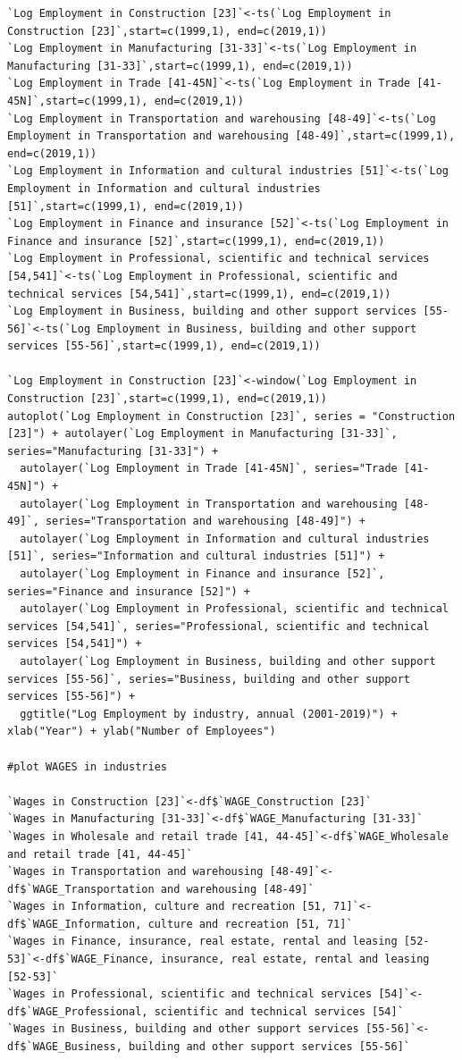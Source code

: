 \documentclass[12pt]{article}
\begin{document}
\begin{verbatim}
`Log Employment in Construction [23]`<-ts(`Log Employment in Construction [23]`,start=c(1999,1), end=c(2019,1))
`Log Employment in Manufacturing [31-33]`<-ts(`Log Employment in Manufacturing [31-33]`,start=c(1999,1), end=c(2019,1))
`Log Employment in Trade [41-45N]`<-ts(`Log Employment in Trade [41-45N]`,start=c(1999,1), end=c(2019,1))
`Log Employment in Transportation and warehousing [48-49]`<-ts(`Log Employment in Transportation and warehousing [48-49]`,start=c(1999,1), end=c(2019,1))
`Log Employment in Information and cultural industries [51]`<-ts(`Log Employment in Information and cultural industries [51]`,start=c(1999,1), end=c(2019,1))
`Log Employment in Finance and insurance [52]`<-ts(`Log Employment in Finance and insurance [52]`,start=c(1999,1), end=c(2019,1))
`Log Employment in Professional, scientific and technical services [54,541]`<-ts(`Log Employment in Professional, scientific and technical services [54,541]`,start=c(1999,1), end=c(2019,1))
`Log Employment in Business, building and other support services [55-56]`<-ts(`Log Employment in Business, building and other support services [55-56]`,start=c(1999,1), end=c(2019,1))

`Log Employment in Construction [23]`<-window(`Log Employment in Construction [23]`,start=c(1999,1), end=c(2019,1)) 
autoplot(`Log Employment in Construction [23]`, series = "Construction [23]") + autolayer(`Log Employment in Manufacturing [31-33]`, series="Manufacturing [31-33]") +
  autolayer(`Log Employment in Trade [41-45N]`, series="Trade [41-45N]") +
  autolayer(`Log Employment in Transportation and warehousing [48-49]`, series="Transportation and warehousing [48-49]") +
  autolayer(`Log Employment in Information and cultural industries [51]`, series="Information and cultural industries [51]") +
  autolayer(`Log Employment in Finance and insurance [52]`, series="Finance and insurance [52]") +
  autolayer(`Log Employment in Professional, scientific and technical services [54,541]`, series="Professional, scientific and technical services [54,541]") +
  autolayer(`Log Employment in Business, building and other support services [55-56]`, series="Business, building and other support services [55-56]") +
  ggtitle("Log Employment by industry, annual (2001-2019)") + xlab("Year") + ylab("Number of Employees")

#plot WAGES in industries

`Wages in Construction [23]`<-df$`WAGE_Construction [23]`
`Wages in Manufacturing [31-33]`<-df$`WAGE_Manufacturing [31-33]`
`Wages in Wholesale and retail trade [41, 44-45]`<-df$`WAGE_Wholesale and retail trade [41, 44-45]`
`Wages in Transportation and warehousing [48-49]`<-df$`WAGE_Transportation and warehousing [48-49]`
`Wages in Information, culture and recreation [51, 71]`<-df$`WAGE_Information, culture and recreation [51, 71]`	
`Wages in Finance, insurance, real estate, rental and leasing [52-53]`<-df$`WAGE_Finance, insurance, real estate, rental and leasing [52-53]`
`Wages in Professional, scientific and technical services [54]`<-df$`WAGE_Professional, scientific and technical services [54]`
`Wages in Business, building and other support services [55-56]`<-df$`WAGE_Business, building and other support services [55-56]`


\end{verbatim}
\end{document}
